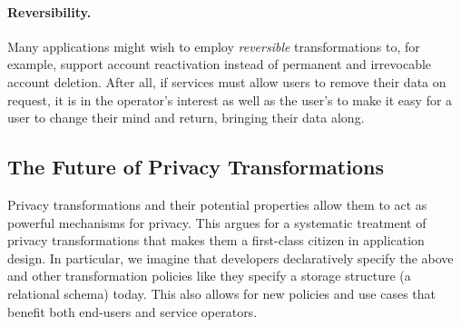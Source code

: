\paragraph{Reversibility.}
%
Many applications might wish to employ \emph{reversible} transformations to, for example, support
account reactivation instead of permanent and irrevocable account deletion.
%
After all, if services must allow users to remove their data on request, it is in the operator's
interest as well as the user's to make it easy for a user to change their mind and return, bringing their data along.
%
%
%
%

\subsection{The Future of Privacy Transformations}
%
%
Privacy transformations and their potential properties allow them to act as powerful mechanisms for
privacy. This argues for a systematic treatment of privacy transformations that makes them a
first-class citizen in application design.
%
In particular, we imagine that developers declaratively specify the above and other
transformation policies like they specify a storage structure (\eg a relational schema) today.
%
This also allows for new policies and use cases that benefit both end-users and service operators.
%
%
